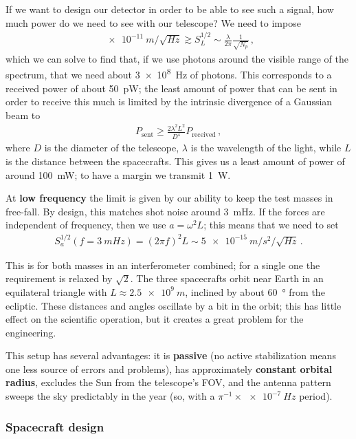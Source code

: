 \documentclass[main.tex]{subfiles}
\begin{document}
If we want to design our detector in order to be able to see such a signal, how much power do we need to see with our telescope? We need to impose 
%
\begin{align}
\SI{e-11}{m / \sqrt{Hz}} \gtrsim
S^{1/2}_{L} \sim \frac{\lambda }{2 \pi} \frac{1}{\sqrt{N_p}}
\,,
\end{align}
%
which we can solve to find that, if we use photons around the visible range of the spectrum, that we need about \SI{3e8}{Hz} of photons. 
This corresponds to a received power of about \SI{50}{pW}; the least amount of power that can be sent in order to receive this much is limited by the intrinsic divergence of a Gaussian beam to 
%
\begin{align}
P _{\text{sent}} \geq \frac{2 \lambda^2 L^2}{D^{4}} P _{\text{received}}
\,,
\end{align}
%
where \(D\) is the diameter of the telescope, \(\lambda \) is the wavelength of the light, while \(L\) is the distance between the spacecrafts. This gives us a least amount of power of around \SI{100}{mW}; to have a margin we transmit \SI{1}{W}. 

At \textbf{low frequency} the limit is given by our ability to keep the test masses in free-fall. 
By design, this matches shot noise around \SI{3}{mHz}. 
If the forces are independent of frequency, then we use \(a = \omega^2 L\); this means that we need to set 
%
\begin{align}
S^{1/2}_{a} ( f = \SI{3}{mHz}) = (2 \pi f)^2 L \sim \SI{5e-15}{m/s^2 / \sqrt{Hz}}
\,.
\end{align}

This is for both masses in an interferometer combined; for a single one the requirement is relaxed by \(\sqrt{2}\). 
The three spacecrafts orbit near Earth in an equilateral triangle with \( L \approx \SI{2.5e9}{m}\), inclined by about \SI{60}{\degree} from the ecliptic. 
These distances and angles oscillate by a bit in the orbit; this has little effect on the scientific operation, but it creates a great problem for the engineering. 

This setup has several advantages: it is \textbf{passive} (no active stabilization means one less source of errors and problems), has approximately \textbf{constant orbital radius}, excludes the Sun from the telescope's FOV, and the antenna pattern sweeps the sky predictably  in the year (so, with a \(\pi^{-1}\times\SI{e-7}{Hz}\) period).

\subsubsection{Spacecraft design}
\end{document}
